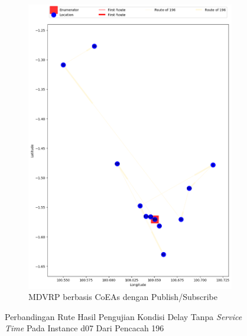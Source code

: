 \begin{figure}[H]\ContinuedFloat
	\centering
	\begin{subfigure}[t]{\textwidth}
		\centering
		\includegraphics[width=\textwidth]{Resources/Images/delayed_7/real_m15_n100_delayed_7_196_pubsub_coes}
		\caption{MDVRP berbasis CoEAs dengan Publish/Subscribe}
		\label{fig:real_m15_n100_delayed_7_196_pubsub_coes}
	\end{subfigure}
	\caption{Perbandingan Rute Hasil Pengujian Kondisi Delay Tanpa \textit{Service Time} Pada Instance d07 Dari Pencacah 196}
	\label{fig:real_m15_n100_delayed_7_196_contd}
\end{figure}


